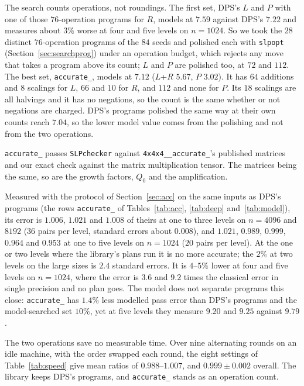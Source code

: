 \documentclass[11pt]{article}
\theoremstyle{remark}
\newcommand{\acct}{\texttt{4x4x4\_\allowbreak 48\_\allowbreak accurate\_\allowbreak 262}\xspace}
\newcommand{\aczs}{\texttt{accurate\_\allowbreak 260}\xspace}
\begin{document}
The search counts operations, not roundings.  The first set, DPS's $L$
and $P$ with one of those $76$-operation programs for $R$, models at $7.59$
against DPS's $7.22$ and measures about $3\%$ worse at four and five levels
on $n=1024$.  So we took the $28$ distinct $76$-operation programs of the
$84$ seeds and polished each with \texttt{slpopt}
(Section~\ref{sec:searchprog}) under an operation budget, which rejects
any move that takes a program above its count; $L$ and $P$ are polished
too, at $72$ and $112$.  The best set, \aczs, models at $7.12$ ($L$+$R$
$5.67$, $P$ $3.02$).  It has $64$ additions and $8$ scalings for $L$, $66$
and $10$ for $R$, and $112$ and none for $P$.  Its $18$ scalings are all
halvings and it has no negations, so the count is the same whether or not
negations are charged.  DPS's programs polished the same way at their own
counts reach $7.04$, so the lower model value comes from the polishing and
not from the two operations.

\aczs passes \texttt{SLPchecker} against \acct's published matrices and
our exact check against the matrix multiplication tensor.  The matrices
being the same, so are the growth factors, $Q_0$ and the amplification.

Measured with the protocol of Section~\ref{sec:acc} on the same inputs as
DPS's programs (the rows \aczs of Tables~\ref{tab:acc}, \ref{tab:deep}
and~\ref{tab:model}), its error is $1.006$, $1.021$ and $1.008$ of theirs
at one to three levels on $n=4096$ and $8192$ ($36$ pairs per level,
standard errors about $0.008$), and $1.021$, $0.989$, $0.999$, $0.964$ and
$0.953$ at one to five levels on $n=1024$ ($20$ pairs per level).  At the
one or two levels where the library's plans run it is no more accurate;
the $2\%$ at two levels on the large sizes is $2.4$ standard errors.  It
is $4$--$5\%$ lower at four and five levels on $n=1024$, where the error
is $3.6$ and $9.2$ times the classical error in single precision and no
plan goes.  The model does not separate programs this close: \aczs has
$1.4\%$ less modelled pass error than DPS's programs and the
model-searched set $10\%$, yet at five levels they measure $9.20$ and
$9.25$ against $9.79$.

The two operations save no measurable time.  Over nine alternating rounds
on an idle machine, with the order swapped each round, the eight settings
of Table~\ref{tab:speed} give mean ratios of $0.988$--$1.007$, and
$0.999\pm0.002$ overall.  The library keeps DPS's programs, and \aczs
stands as an operation count.
\end{document}
